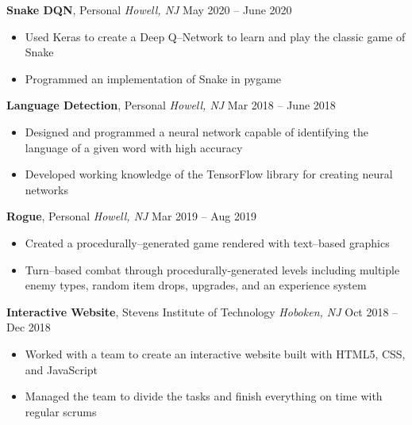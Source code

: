 \documentclass[10pt,letterpaper,roman]{moderncv}
\begin{document}
\hfill

\textbf{Snake DQN}, Personal \textit{Howell, NJ} \hfill May 2020 -- June 2020
\begin{itemize}
	\item Used Keras to create a Deep Q--Network to learn and play the classic game of Snake
	\item Programmed an implementation of Snake in pygame
\end{itemize}

\hfill

\textbf{Language Detection}, Personal \textit{Howell, NJ} \hfill Mar 2018 -- June 2018
\begin{itemize}
	\item Designed and programmed a neural network capable of identifying the language of a given word with high accuracy
	\item Developed working knowledge of the TensorFlow library for creating neural networks
\end{itemize}

\hfill

\textbf{Rogue}, Personal \textit{Howell, NJ} \hfill Mar 2019 -- Aug 2019
\begin{itemize}
	\item Created a procedurally--generated game rendered with text--based graphics
	\item Turn--based combat through procedurally-generated levels including multiple enemy types, random item drops, upgrades, and an experience system
\end{itemize}

\hfill

\textbf{Interactive Website}, Stevens Institute of Technology \textit{Hoboken, NJ} \hfill Oct 2018 -- Dec 2018
\begin{itemize}
	\item Worked with a team to create an interactive website built with HTML5, CSS, and JavaScript
	\item Managed the team to divide the tasks and finish everything on time with regular scrums
\end{itemize}
\end{document}
